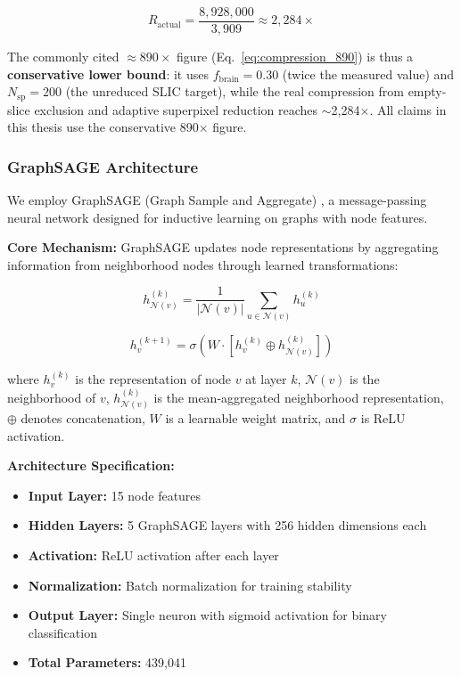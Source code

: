 \documentclass{article}
\begin{document}
\begin{equation}
R_{\text{actual}} = \frac{8{,}928{,}000}{3{,}909} \approx 2{,}284\times
\label{eq:compression_actual}
\end{equation}

The commonly cited $\approx 890\times$ figure (Eq.~\ref{eq:compression_890}) is thus a \textbf{conservative lower bound}: it uses $f_{\text{brain}} = 0.30$ (twice the measured value) and $N_{\text{sp}} = 200$ (the unreduced SLIC target), while the real compression from empty-slice exclusion and adaptive superpixel reduction reaches $\sim$2,284$\times$. All claims in this thesis use the conservative 890$\times$ figure.

\subsubsection{GraphSAGE Architecture}

We employ GraphSAGE (Graph Sample and Aggregate) \cite{hamilton2017graphsage}, a message-passing neural network designed for inductive learning on graphs with node features.

\textbf{Core Mechanism:} GraphSAGE updates node representations by aggregating information from neighborhood nodes through learned transformations:

\begin{equation}
h_{\mathcal{N}(v)}^{(k)} = \frac{1}{|\mathcal{N}(v)|} \sum_{u \in \mathcal{N}(v)} h_u^{(k)}
\end{equation}

\begin{equation}
h_v^{(k+1)} = \sigma \left( W \cdot \left[ h_v^{(k)} \oplus h_{\mathcal{N}(v)}^{(k)} \right] \right)
\end{equation}

where $h_v^{(k)}$ is the representation of node $v$ at layer $k$, $\mathcal{N}(v)$ is the neighborhood of $v$, $h_{\mathcal{N}(v)}^{(k)}$ is the mean-aggregated neighborhood representation, $\oplus$ denotes concatenation, $W$ is a learnable weight matrix, and $\sigma$ is ReLU activation.

\textbf{Architecture Specification:}
\begin{itemize}
    \item \textbf{Input Layer:} 15 node features
    \item \textbf{Hidden Layers:} 5 GraphSAGE layers with 256 hidden dimensions each
    \item \textbf{Activation:} ReLU activation after each layer
    \item \textbf{Normalization:} Batch normalization for training stability
    \item \textbf{Output Layer:} Single neuron with sigmoid activation for binary classification
    \item \textbf{Total Parameters:} 439,041
\end{itemize}
\end{document}
